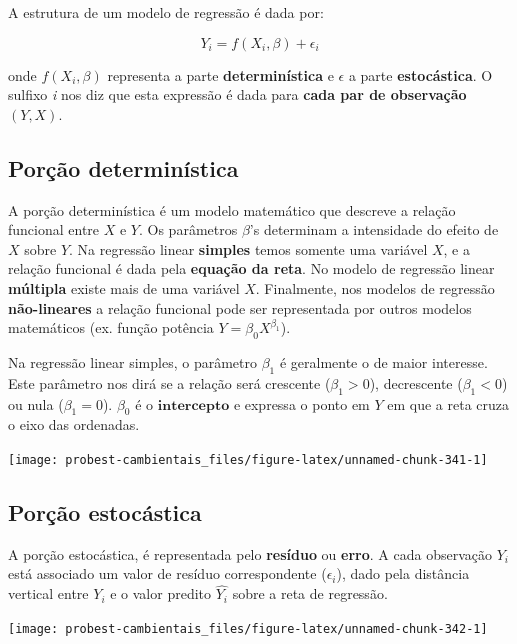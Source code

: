 \documentclass[
]{book}
\begin{document}
A estrutura de um modelo de regressão é dada por:

\[Y_i = f(X_i, \beta) + \epsilon_i\]

onde \(f(X_i, \beta)\) representa a parte \textbf{determinística} e \(\epsilon\) a parte \textbf{estocástica}. O sulfixo \emph{i} nos diz que esta expressão é dada para \textbf{cada par de observação} \((Y,X)\).

\hypertarget{poruxe7uxe3o-determinuxedstica}{%
\subsection{Porção determinística}\label{poruxe7uxe3o-determinuxedstica}}

A porção determinística é um modelo matemático que descreve a relação funcional entre \(X\) e \(Y\). Os parâmetros \(\beta\)'s determinam a intensidade do efeito de \(X\) sobre \(Y\). Na regressão linear \textbf{simples} temos somente uma variável \(X\), e a relação funcional é dada pela \textbf{equação da reta}. No modelo de regressão linear \textbf{múltipla} existe mais de uma variável \(X\). Finalmente, nos modelos de regressão \textbf{não-lineares} a relação funcional pode ser representada por outros modelos matemáticos (ex. função potência \(Y = \beta_0X^{\beta_1}\)).

Na regressão linear simples, o parâmetro \(\beta_1\) é geralmente o de maior interesse. Este parâmetro nos dirá se a relação será crescente (\(\beta_1 > 0\)), decrescente (\(\beta_1 < 0\)) ou nula (\(\beta_1 = 0\)). \(\beta_0\) é o \(\textbf{intercepto}\) e expressa o ponto em \(Y\) em que a reta cruza o eixo das ordenadas.

\begin{center}\texttt{[image: probest-cambientais\_files/figure-latex/unnamed-chunk-341-1]} \end{center}

\hypertarget{poruxe7uxe3o-estocuxe1stica}{%
\subsection{Porção estocástica}\label{poruxe7uxe3o-estocuxe1stica}}

A porção estocástica, é representada pelo \textbf{resíduo} ou \textbf{erro}. A cada observação \(Y_i\) está associado um valor de resíduo correspondente (\(\epsilon_i\)), dado pela distância vertical entre \(Y_i\) e o valor predito \(\hat{Y_i}\) sobre a reta de regressão.

\begin{center}\texttt{[image: probest-cambientais\_files/figure-latex/unnamed-chunk-342-1]} \end{center}
\end{document}
